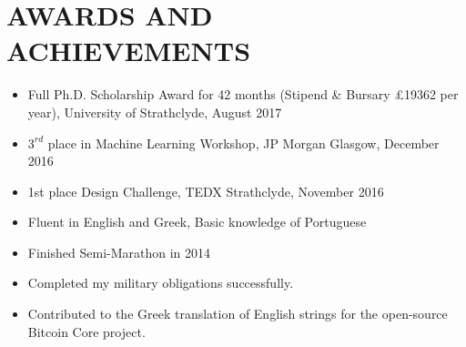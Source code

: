 \section{AWARDS AND ACHIEVEMENTS}
\begin{minipage}{\maincolumnwidth}%
	\small{
    	\begin{itemize}
          \item Full Ph.D. Scholarship Award for 42 months (Stipend \& Bursary £19362 per year), University of Strathclyde, August 2017
          \item $3^{rd}$ place in Machine Learning Workshop, JP Morgan Glasgow, December 2016
          \item 1st place Design Challenge, TEDX Strathclyde, November 2016
          \item Fluent in English and Greek, Basic knowledge of Portuguese
          \item Finished Semi-Marathon in 2014
          \item Completed my military obligations successfully.
          \item Contributed to the Greek translation of English strings for the open-source Bitcoin Core project.
		\end{itemize}}
\end{minipage}